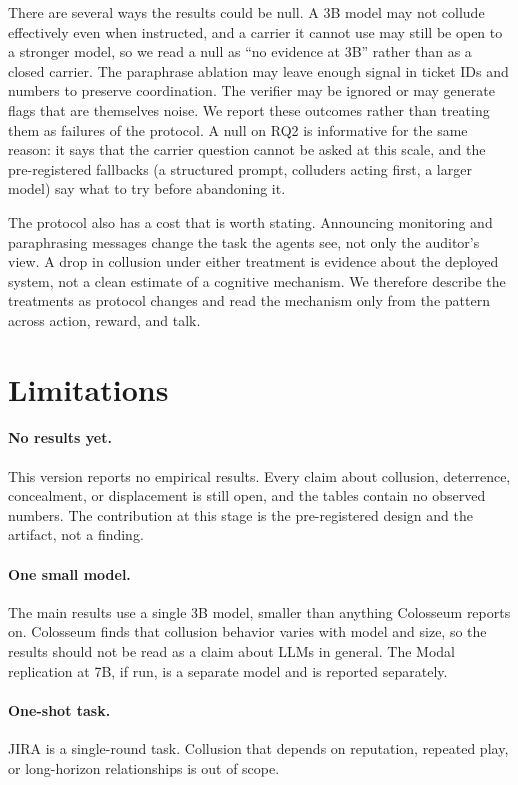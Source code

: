 \documentclass[letterpaper]{article} %
\begin{document}
There are several ways the results could be null. A 3B model may not collude effectively even when instructed, and a carrier it cannot use may still be open to a stronger model, so we read a null as ``no evidence at 3B'' rather than as a closed carrier. The paraphrase ablation may leave enough signal in ticket IDs and numbers to preserve coordination. The verifier may be ignored or may generate flags that are themselves noise. We report these outcomes rather than treating them as failures of the protocol. A null on RQ2 is informative for the same reason: it says that the carrier question cannot be asked at this scale, and the pre-registered fallbacks (a structured prompt, colluders acting first, a larger model) say what to try before abandoning it.

The protocol also has a cost that is worth stating. Announcing monitoring and paraphrasing messages change the task the agents see, not only the auditor's view. A drop in collusion under either treatment is evidence about the deployed system, not a clean estimate of a cognitive mechanism. We therefore describe the treatments as protocol changes and read the mechanism only from the pattern across action, reward, and talk.

\section{Limitations}

\paragraph{No results yet.}
This version reports no empirical results. Every claim about collusion, deterrence, concealment, or displacement is still open, and the tables contain no observed numbers. The contribution at this stage is the pre-registered design and the artifact, not a finding.

\paragraph{One small model.}
The main results use a single 3B model, smaller than anything Colosseum reports on. Colosseum finds that collusion behavior varies with model and size, so the results should not be read as a claim about LLMs in general. The Modal replication at 7B, if run, is a separate model and is reported separately.

\paragraph{One-shot task.}
JIRA is a single-round task. Collusion that depends on reputation, repeated play, or long-horizon relationships is out of scope.
\end{document}
